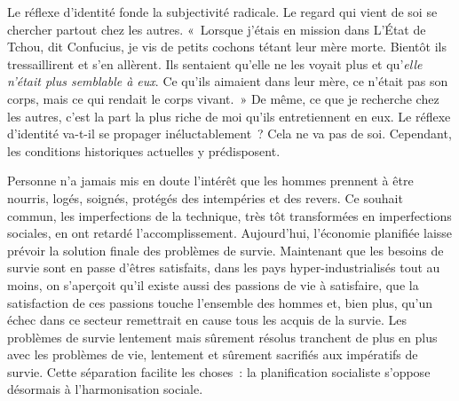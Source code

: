 \documentclass[french,twoside]{book} %
\newcommand{\astermono}{\medskip\centerline{\color{rubric}\large\selectfont{\syms ✻}}\medskip\par}%
\begin{document}
Le réflexe d’identité fonde la subjectivité radicale. Le regard qui vient de soi se chercher partout chez les autres. « Lorsque j’étais en mission dans L’État de Tchou, dit Confucius, je vis de petits cochons tétant leur mère morte. Bientôt ils tressaillirent et s’en allèrent. Ils sentaient qu’elle ne les voyait plus et qu’\emph{elle n’était plus semblable à eux}. Ce qu’ils aimaient dans leur mère, ce n’était pas son corps, mais ce qui rendait le corps vivant. » De même, ce que je recherche chez les autres, c’est la part la plus riche de moi qu’ils entretiennent en eux. Le réflexe d’identité va-t-il se propager inéluctablement ? Cela ne va pas de soi. Cependant, les conditions historiques actuelles y prédisposent.\par
Personne n’a jamais mis en doute l’intérêt que les hommes prennent à être nourris, logés, soignés, protégés des intempéries et des revers. Ce souhait commun, les imperfections de la technique, très tôt transformées en imperfections sociales, en ont retardé l’accomplissement. Aujourd’hui, l’économie planifiée laisse prévoir la solution finale des problèmes de survie. Maintenant que les besoins de survie sont en passe d’êtres satisfaits, dans les pays hyper-industrialisés tout au moins, on s’aperçoit qu’il existe aussi des passions de vie à satisfaire, que la satisfaction de ces passions touche l’ensemble des hommes et, bien plus, qu’un échec dans ce secteur remettrait en cause tous les acquis de la survie. Les problèmes de survie lentement mais sûrement résolus tranchent de plus en plus avec les problèmes de vie, lentement et sûrement sacrifiés aux impératifs de survie. Cette séparation facilite les choses : la planification socialiste s’oppose désormais à l’harmonisation sociale.\par

\astermono
\end{document}
